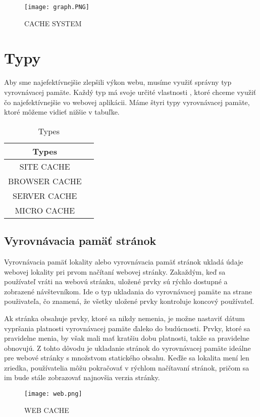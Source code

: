 \documentclass[10pt,oneside,slovak,a4paper]{article}
\begin{document}
\begin{figure}[H]
\centering
\texttt{[image: graph.PNG]}
\caption{CACHE SYSTEM\cite{IEEE}}
\label{fig:diag2}
\end{figure}

\section{Typy}
\quad Aby sme najefektívnejšie zlepšili výkon webu, musíme využiť správny typ vyrovnávacej pamäte. Každý typ má svoje určité vlastnosti , ktoré chceme využiť čo najefektívnejšie vo webovej aplikácii. Máme štyri typy vyrovnávacej pamäte, ktoré môžeme vidieť nižšie v tabuľke.

\begin{table}[H]
\centering
\begin{tabular}{|c|c|}
\hline
    \textbf{Types} \\
     \hline
     SITE CACHE  \\
     \hline
     BROWSER CACHE  \\
     \hline
     SERVER CACHE  \\
     \hline
     MICRO CACHE  \\
    \hline
\end{tabular}
\caption{Types\cite{MAN}}
\label{fig:tab1}
\end{table}


\subsection{Vyrovnávacia pamäť stránok}
\quad
Vyrovnávacia pamäť lokality alebo vyrovnávacia pamäť stránok ukladá údaje webovej lokality pri prvom načítaní webovej stránky. Zakaždým, keď sa používateľ
vráti na  webovú stránku, uložené prvky sú rýchlo dostupné a zobrazené návštevníkom. \cite{MAN}Ide o typ ukladania do vyrovnávacej pamäte na strane použivateľa, čo znamená, že všetky uložené prvky kontroluje koncový používateľ.

Ak stránka obsahuje prvky, ktoré sa nikdy nemenia, je možne nastaviť dátum vypršania platnosti vyrovnávacej pamäte ďaleko do budúcnosti. Prvky, ktoré sa pravidelne menia, by však mali mať kratšiu dobu platnosti, takže sa pravidelne obnovujú. Z tohto dôvodu je ukladanie stránok do vyrovnávacej pamäte ideálne pre webové stránky s množstvom statického obsahu. Keďže sa  lokalita mení len zriedka, používatelia môžu pokračovať v rýchlom načítavaní  stránok, pričom sa im bude stále zobrazovať najnovšia verzia stránky.
\begin{figure}[H]
\centering
\texttt{[image: web.png]}
\caption{WEB CACHE\cite{CHECK}}
\label{fig:diag}
\end{figure}
\end{document}
